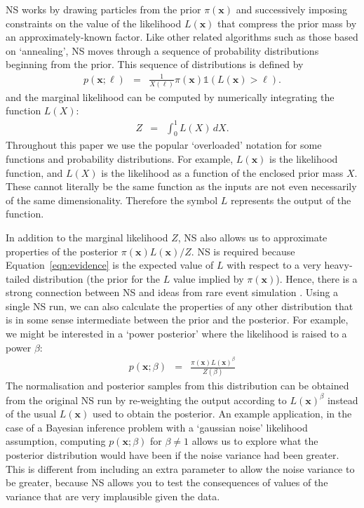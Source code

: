 \documentclass[journal,article,accept,moreauthors,pdftex,12pt,a4paper]{mdpi}
\newcommand{\xx}{\boldsymbol{x}}
\begin{document}
NS works by drawing particles from the
prior $\pi(\xx)$ and successively imposing constraints on the value of
the likelihood $L(\xx)$ that compress the prior mass by an
approximately-known factor. Like other related algorithms such as those
based on `annealing', NS
moves through a sequence of probability distributions beginning from the
prior. This sequence of distributions is defined by
\begin{eqnarray}
p(\xx; \ell) &=& \frac{1}{X(\ell)}\pi(\xx)\mathds{1}\left(L(\xx) > \ell\right).
\end{eqnarray}
and the marginal likelihood can be computed by numerically integrating the
function $L(X)$:
\begin{eqnarray}
Z &=& \int_0^1 L(X)\, dX.
\end{eqnarray}
Throughout this paper we use the popular `overloaded' notation for some
functions and probability distributions.
For example, $L(\xx)$ is the likelihood function, and $L(X)$ is the likelihood
as a function of the enclosed prior mass $X$. These cannot literally be the
same function as the inputs are not even necessarily of the same dimensionality.
Therefore the symbol $L$ represents the output of the function.

In addition to the marginal likelihood $Z$, NS also allows us
to approximate properties of the posterior $\pi(\xx)L(\xx)/Z$.
NS is required because Equation~\ref{eqn:evidence}
is the expected value of $L$ with respect to a very heavy-tailed distribution
(the prior for the $L$ value implied by $\pi(\xx)$). Hence, there is a strong
connection between NS and ideas from rare event simulation \citep{walter}.
Using a single NS run, we can also calculate the properties of any other distribution that
is in some sense intermediate
between the prior and the posterior. For example, we might be interested in
a `power posterior' where the likelihood is raised to a power $\beta$:
\begin{eqnarray}
p(\xx; \beta) &=& \frac{\pi(\xx)L(\xx)^\beta}{Z(\beta)}\label{eqn:power_posterior}
\end{eqnarray}
The normalisation and posterior samples from this distribution can be obtained
from the original NS run by re-weighting the output according to $L(\xx)^\beta$
instead of the usual $L(\xx)$ used to obtain the posterior.
An example application, in the case of
a Bayesian inference problem with a `gaussian noise' likelihood assumption,
computing $p(\xx; \beta)$ for $\beta \neq 1$ allows us to explore what the
posterior distribution would have been if the noise variance had been greater.
This is different from including an extra parameter to allow the noise variance
to be greater, because NS allows you to test the consequences of values of the
variance that are very implausible given the data.
\end{document}
